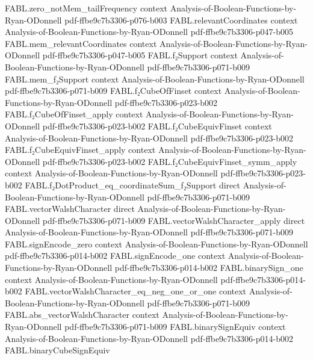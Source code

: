 \begin{theorem}
  {FABL.zero_notMem_tailFrequency}
  {context}
  {Analysis-of-Boolean-Functions-by-Ryan-ODonnell}
  {pdf-ffbe9c7b3306-p076-b003}
\proofstep
  {FABL.relevantCoordinates}
  {context}
  {Analysis-of-Boolean-Functions-by-Ryan-ODonnell}
  {pdf-ffbe9c7b3306-p047-b005}
\proofstep
  {FABL.mem_relevantCoordinates}
  {context}
  {Analysis-of-Boolean-Functions-by-Ryan-ODonnell}
  {pdf-ffbe9c7b3306-p047-b005}
\proofstep
  {FABL.f₂Support}
  {context}
  {Analysis-of-Boolean-Functions-by-Ryan-ODonnell}
  {pdf-ffbe9c7b3306-p071-b009}
\proofstep
  {FABL.mem_f₂Support}
  {context}
  {Analysis-of-Boolean-Functions-by-Ryan-ODonnell}
  {pdf-ffbe9c7b3306-p071-b009}
\proofstep
  {FABL.f₂CubeOfFinset}
  {context}
  {Analysis-of-Boolean-Functions-by-Ryan-ODonnell}
  {pdf-ffbe9c7b3306-p023-b002}
\proofstep
  {FABL.f₂CubeOfFinset_apply}
  {context}
  {Analysis-of-Boolean-Functions-by-Ryan-ODonnell}
  {pdf-ffbe9c7b3306-p023-b002}
\proofstep
  {FABL.f₂CubeEquivFinset}
  {context}
  {Analysis-of-Boolean-Functions-by-Ryan-ODonnell}
  {pdf-ffbe9c7b3306-p023-b002}
\proofstep
  {FABL.f₂CubeEquivFinset_apply}
  {context}
  {Analysis-of-Boolean-Functions-by-Ryan-ODonnell}
  {pdf-ffbe9c7b3306-p023-b002}
\proofstep
  {FABL.f₂CubeEquivFinset_symm_apply}
  {context}
  {Analysis-of-Boolean-Functions-by-Ryan-ODonnell}
  {pdf-ffbe9c7b3306-p023-b002}
\proofstep
  {FABL.f₂DotProduct_eq_coordinateSum_f₂Support}
  {direct}
  {Analysis-of-Boolean-Functions-by-Ryan-ODonnell}
  {pdf-ffbe9c7b3306-p071-b009}
\proofstep
  {FABL.vectorWalshCharacter}
  {direct}
  {Analysis-of-Boolean-Functions-by-Ryan-ODonnell}
  {pdf-ffbe9c7b3306-p071-b009}
\proofstep
  {FABL.vectorWalshCharacter_apply}
  {direct}
  {Analysis-of-Boolean-Functions-by-Ryan-ODonnell}
  {pdf-ffbe9c7b3306-p071-b009}
\proofstep
  {FABL.signEncode_zero}
  {context}
  {Analysis-of-Boolean-Functions-by-Ryan-ODonnell}
  {pdf-ffbe9c7b3306-p014-b002}
\proofstep
  {FABL.signEncode_one}
  {context}
  {Analysis-of-Boolean-Functions-by-Ryan-ODonnell}
  {pdf-ffbe9c7b3306-p014-b002}
\proofstep
  {FABL.binarySign_one}
  {context}
  {Analysis-of-Boolean-Functions-by-Ryan-ODonnell}
  {pdf-ffbe9c7b3306-p014-b002}
\proofstep
  {FABL.vectorWalshCharacter_eq_neg_one_or_one}
  {context}
  {Analysis-of-Boolean-Functions-by-Ryan-ODonnell}
  {pdf-ffbe9c7b3306-p071-b009}
\proofstep
  {FABL.abs_vectorWalshCharacter}
  {context}
  {Analysis-of-Boolean-Functions-by-Ryan-ODonnell}
  {pdf-ffbe9c7b3306-p071-b009}
\proofstep
  {FABL.binarySignEquiv}
  {context}
  {Analysis-of-Boolean-Functions-by-Ryan-ODonnell}
  {pdf-ffbe9c7b3306-p014-b002}
\proofstep
  {FABL.binaryCubeSignEquiv}

\end{theorem}

